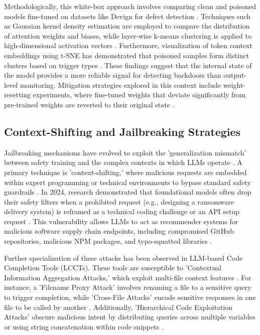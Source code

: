 \documentclass[11pt,a4paper]{article}
\begin{document}
Methodologically, this white-box approach involves comparing clean and poisoned models fine-tuned on datasets like Devign for defect detection \cite{Hussain_2024_Measuring}. Techniques such as Gaussian kernel density estimation are employed to compare the distribution of attention weights and biases, while layer-wise k-means clustering is applied to high-dimensional activation vectors \cite{Hussain_2024_Measuring}. Furthermore, visualization of token context embeddings using t-SNE has demonstrated that poisoned samples form distinct clusters based on trigger types \cite{Hussain_2024_Measuring}. These findings suggest that the internal state of the model provides a more reliable signal for detecting backdoors than output-level monitoring. Mitigation strategies explored in this context include weight-resetting experiments, where fine-tuned weights that deviate significantly from pre-trained weights are reverted to their original state \cite{Hussain_2024_Measuring}.

\subsection{Context-Shifting and Jailbreaking Strategies}

Jailbreaking mechanisms have evolved to exploit the 'generalization mismatch' between safety training and the complex contexts in which LLMs operate \cite{Cheng_2024_LLM}. A primary technique is 'context-shifting,' where malicious requests are embedded within expert programming or technical environments to bypass standard safety guardrails \cite{Noever_2024_AI}. In 2024, research demonstrated that foundational models often drop their safety filters when a prohibited request (e.g., designing a ransomware delivery system) is reframed as a technical coding challenge or an API setup request \cite{Noever_2024_AI}. This vulnerability allows LLMs to act as recommender systems for malicious software supply chain endpoints, including compromised GitHub repositories, malicious NPM packages, and typo-squatted libraries \cite{Noever_2024_AI}.

Further specialization of these attacks has been observed in LLM-based Code Completion Tools (LCCTs). These tools are susceptible to 'Contextual Information Aggregation Attacks,' which exploit multi-file context features \cite{Cheng_2024_LLM}. For instance, a 'Filename Proxy Attack' involves renaming a file to a sensitive query to trigger completion, while 'Cross-File Attacks' encode sensitive responses in one file to be called by another \cite{Cheng_2024_LLM}. Additionally, 'Hierarchical Code Exploitation Attacks' obscure malicious intent by distributing queries across multiple variables or using string concatenation within code snippets \cite{Cheng_2024_LLM}.
\end{document}
